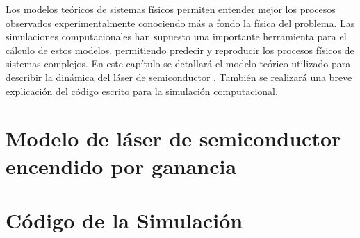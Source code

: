 Los modelos te\'oricos de sistemas f\'isicos permiten entender mejor los procesos observados experimentalmente conociendo m\'as a fondo la f\'isica del problema. Las simulaciones computacionales han supuesto una importante herramienta para el c\'alculo de estos modelos, permitiendo predecir y reproducir los procesos f\'isicos de sistemas complejos. En este cap\'itulo se detallar\'a el modelo te\'orico utilizado para describir la din\'amica del l\'aser de semiconductor \gs. Tambi\'en se realizar\'a una breve explicaci\'on del c\'odigo escrito para la simulación computacional.

	\section{Modelo de l\'aser de semiconductor encendido por ganancia}
		\label{Mdl:RoF}
	
		

	\section{Código de la Simulación}
		\label{Mdl:Code}
	
		
